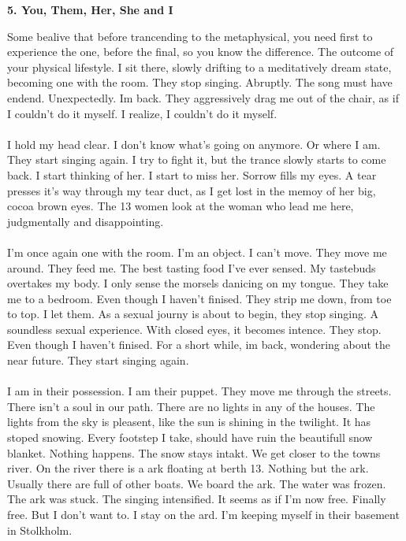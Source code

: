 \documentclass[]{article}
\begin{document}
\newpage

\begin{center}
	\large\textbf{5. You, Them, Her, She and I}
\end{center}

Some bealive that before trancending to the metaphysical, you need first to experience the one, before the final, so you know the difference. The outcome of your physical lifestyle. I sit there, slowly drifting to a meditatively dream state, becoming one with the room. They stop singing. Abruptly. The song must have endend. Unexpectedly. Im back. They aggressively drag me out of the chair, as if I couldn't do it myself. I realize, I couldn't do it myself.
\\ \\
I hold my head clear. I don't know what's going on anymore. Or where I am. They start singing again. I try to fight it, but the trance slowly starts to come back. I start thinking of her. I start to miss her. Sorrow fills my eyes. A tear presses it's way through my tear duct, as I get lost in the memoy of her big,  cocoa brown eyes. The 13 women look at the woman who lead me here, judgmentally and disappointing.
\\ \\
I'm once again one with the room. I'm an object. I can't move. They move me around. They feed me. The best tasting food I've ever sensed. My tastebuds overtakes my body. I only sense the morsels danicing on my tongue. They take me to a bedroom. Even though I haven't finised. They strip me down, from toe to top. I let them. As a sexual journy is about to begin, they stop singing. A soundless sexual experience. With closed eyes, it becomes intence. They stop. Even though I haven't finised. For a short while, im back, wondering about the near future. They start singing again. 
\\ \\
I am in their possession. I am their puppet. They move me through the streets. There isn't a soul in our path. There are no lights in any of the houses. The lights from the sky is pleasent, like the sun is shining in the twilight. It has stoped snowing. Every footstep I take, should have ruin the beautifull snow blanket. Nothing happens. The snow stays intakt. We get closer to the towns river. On the river there is a ark floating at berth 13. Nothing but the ark. Usually there are full of other boats. We board the ark. The water was frozen. The ark was stuck. The singing intensified. It seems as if I'm now free. Finally free. But I don't want to. I stay on the ard. I'm keeping myself in their basement in Stolkholm. 
\end{document}
